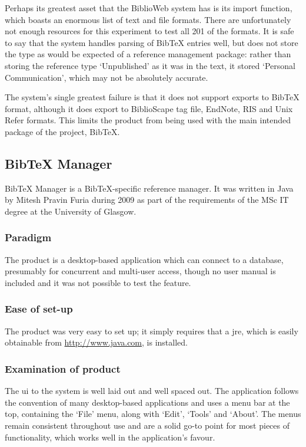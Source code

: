 \documentclass{l4proj}
\newcommand{\BibTeX}{B{\sc ib}\TeX}
\newcommand{\bibtex}{\BibTeX}
\begin{document}
Perhaps its greatest asset that the BiblioWeb system has is its import function, which boasts an enormous list of text and file formats.  There are unfortunately not enough resources for this experiment to test all 201 of the formats.  It is safe to say that the system handles parsing of \bibtex{} entries well, but does not store the type as would be expected of a reference management package: rather than storing the reference type `Unpublished' as it was in the text, it stored `Personal Communication', which may not be absolutely accurate.

The system's single greatest failure is that it does not support exports to \bibtex{} format, although it does export to BiblioScape tag file, EndNote, RIS and Unix Refer formats.  This limits the product from being used with the main intended package of the project, \bibtex.


\subsection{\bibtex{} Manager}
\bibtex{} Manager is a \bibtex{}-specific reference manager.  It was written in Java by Mitesh Pravin Furia during 2009 as part of the requirements of the MSc IT degree at the University of Glasgow.

\subsubsection{Paradigm}
The product is a desktop-based application which can connect to a database, presumably for concurrent and multi-user access, though no user manual is included and it was not possible to test the feature.

\subsubsection{Ease of set-up}
The product was very easy to set up; it simply requires that a \gls{jre}, which is easily obtainable from \url{http://www.java.com}, is installed.

\subsubsection{Examination of product}
The \gls{ui} to the system is well laid out and well spaced out. The application follows the convention of many desktop-based applications and uses a menu bar at the top, containing the `File' menu, along with `Edit', `Tools' and `About'.  The menus remain consistent throughout use and are a solid go-to point for most pieces of functionality, which works well in the application's favour.
\end{document}
